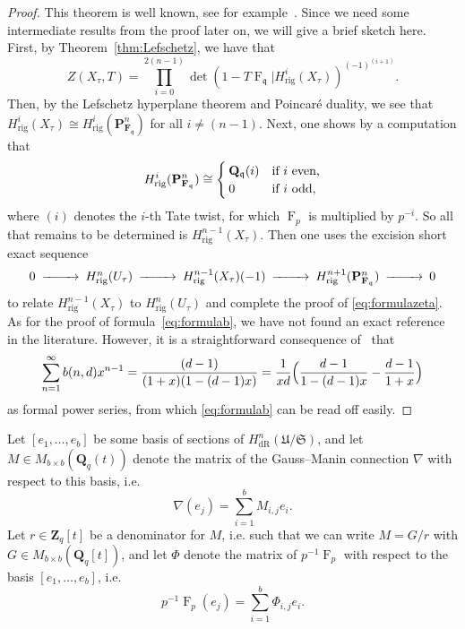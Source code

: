 \documentclass[a4paper,11pt]{article}
\numberwithin{equation}{section}
\newcommand{\ZZ}{\mathbf{Z}} %
\newcommand{\QQ}{\mathbf{Q}} %
\newcommand{\FF}{\mathbf{F}} %
\DeclareMathOperator{\Frob}{F}           %
\providecommand{\HdR}{H_{\text{dR}}}    %
\providecommand{\Hrig}{H_{\text{rig}}}  %
\theoremstyle{definition}
\begin{document}
\begin{proof}
This theorem is well known, see for example~\cite{AbbottKedlayaRoe2006}. 
Since we need some intermediate results from the proof later on, we will 
give a brief sketch here. First, by Theorem~\ref{thm:Lefschetz}, we have that
\[
Z(X_{\tau},T) = \prod_{i=0}^{2(n-1)} \det(1- T \Frob_{\mathfrak{q}} | \Hrig^i(X_{\tau}))^{(-1)^{(i+1)}}.
\]
Then, by the Lefschetz hyperplane theorem and Poincar\'e duality, we see 
that $\Hrig^i(X_{\tau}) \cong \Hrig^i(\mathbf{P}^n_{\FF_{\mathfrak{q}}})$ 
for all $i \neq (n-1)$. Next, one shows by a computation that
\begin{equation} \label{eqn:projcoho}
\Hrig^i(\mathbf{P}^n_{\FF_{\mathfrak{q}}}) 
\cong 
\begin{cases}
\QQ_{\mathfrak{q}}(i) &\mbox{if $i$ even,} \\
$0$ &\mbox{if $i$ odd,} 
\end{cases} 
\end{equation}
where $(i)$ denotes the $i$-th Tate twist, for which $\Frob_p$ is multiplied 
by $p^{-i}$. So all that remains to be determined is $\Hrig^{n-1}(X_{\tau})$. 
Then one uses the excision short exact sequence
\begin{equation} \label{eqn:excision}
\begin{CD}
0 @>>> \Hrig^{n}(U_{\tau}) @>>> \Hrig^{n-1}(X_{\tau})(-1) @>>> \Hrig^{n+1}(\mathbf{P}^n_{\FF_{\mathfrak{q}}}) @>>> 0
\end{CD} 
\end{equation}
to relate $\Hrig^{n-1}(X_{\tau})$ to $\Hrig^{n}(U_{\tau})$ and complete 
the proof of \eqref{eq:formulazeta}. As for the proof of 
formula~\eqref{eq:formulab}, we have not found an exact reference 
in the literature. However, it is a straightforward consequence 
of~\cite[Corollaire 2.4 (i)]{sga7} that 
\[
\sum_{n=1}^{\infty} b(n,d) x^{n-1} = \frac{(d-1)}{(1+x)(1-(d-1)x)} = \frac{1}{xd} \Bigl( \frac{d-1}{1-(d-1)x} - \frac{d-1}{1+x} \Bigr)
\] 
as formal power series, from which \eqref{eq:formulab} can be read off easily.
\end{proof}

Let $[e_1, \ldots, e_b]$ be some basis of sections of 
$\HdR^n(\mathfrak{U}/\mathfrak{S})$, and let $M \in M_{b \times b}(\QQ_q(t))$ 
denote the matrix of the Gauss--Manin connection $\nabla$ with respect 
to this basis, i.e.\ 
\[
\nabla (e_j) = \sum_{i=1}^b M_{i,j} e_i.
\]
Let $r \in \ZZ_q[t]$ be a denominator for $M$, i.e. such that we can write 
$M = G/r$ with $G \in M_{b \times b}(\QQ_q[t])$, and let $\Phi$ denote the 
matrix of $p^{-1}\Frob_p$ with respect to the basis $[e_1, \ldots, e_b]$, i.e.\
\[
p^{-1} \Frob_p (e_j) = \sum_{i=1}^b \Phi_{i,j} e_i.
\]
\end{document}
